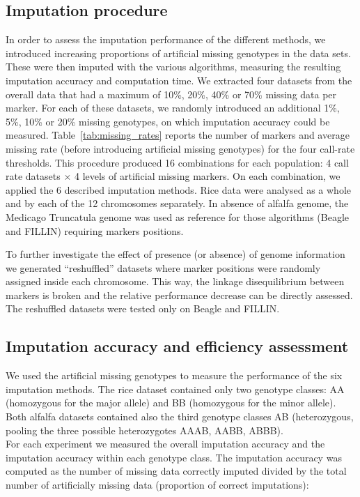 \subsection{Imputation procedure}
\label{sec:imputation_procedure}
In order to assess the imputation performance of the different methods, we introduced increasing proportions of artificial missing genotypes in the data sets. These were then imputed with the various algorithms, measuring the resulting imputation accuracy and computation time. We extracted four datasets from the overall data that had a maximum of 10\%, 20\%, 40\% or 70\% missing data per marker. For each of these datasets, we randomly introduced an additional 1\%, 5\%, 10\% or 20\% missing genotypes, on which imputation accuracy could be measured. Table~\ref{tab:missing_rates} reports the number of markers and average missing rate (before introducing artificial missing genotypes) for the four call-rate thresholds. This procedure produced 16 combinations for each population: 4 call rate datasets $\times$ 4 levels of artificial missing markers. On each combination, we applied the 6 described imputation methods. Rice data were analysed as a whole and by each of the 12 chromosomes separately. In absence of alfalfa genome, the Medicago Truncatula genome was used as reference for those algorithms (Beagle and FILLIN) requiring markers positions. 

To further investigate the effect of presence (or absence) of genome information we generated ``reshuffled'' datasets where marker positions were randomly assigned inside each chromosome. This way, the linkage disequilibrium between markers is broken and the relative performance decrease can be directly assessed. The reshuffled datasets were tested only on Beagle and FILLIN.  



\subsection{Imputation accuracy and efficiency assessment}
\label{sec:imputation_accuracy_and_efficiency_assessment}
We used the artificial missing genotypes to measure the performance of the six imputation methods. The rice dataset contained only two genotype classes: AA (homozygous for the major allele) and BB (homozygous for the minor allele). Both alfalfa datasets contained also the third genotype classes AB (heterozygous, pooling the three possible heterozygotes AAAB, AABB, ABBB).\\
For each experiment we measured the overall imputation accuracy and the imputation accuracy within each genotype class. The imputation accuracy was computed as the number of missing data correctly imputed divided by the total number of artificially missing data (proportion of correct imputations):

